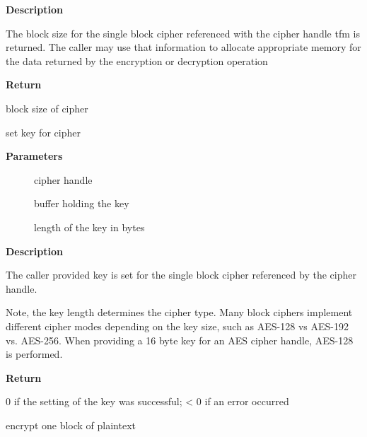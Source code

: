 \documentclass[a4paper,8pt,english]{sphinxmanual}
\begin{document}
\textbf{Description}

The block size for the single block cipher referenced with the cipher handle
tfm is returned. The caller may use that information to allocate appropriate
memory for the data returned by the encryption or decryption operation

\textbf{Return}

block size of cipher

\begin{fulllineitems}
\label{crypto/api-skcipher:c.crypto_cipher_setkey}
set key for cipher

\end{fulllineitems}


\textbf{Parameters}
\begin{description}
\item[{}] \leavevmode
cipher handle

\item[{}] \leavevmode
buffer holding the key

\item[{}] \leavevmode
length of the key in bytes

\end{description}

\textbf{Description}

The caller provided key is set for the single block cipher referenced by the
cipher handle.

Note, the key length determines the cipher type. Many block ciphers implement
different cipher modes depending on the key size, such as AES-128 vs AES-192
vs. AES-256. When providing a 16 byte key for an AES cipher handle, AES-128
is performed.

\textbf{Return}

0 if the setting of the key was successful; \textless{} 0 if an error occurred

\begin{fulllineitems}
\label{crypto/api-skcipher:c.crypto_cipher_encrypt_one}
encrypt one block of plaintext

\end{fulllineitems}
\end{document}
